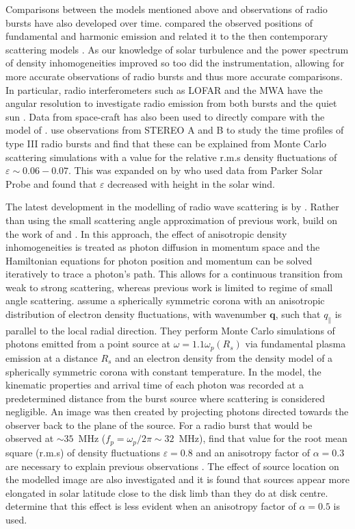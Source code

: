Comparisons between the models mentioned above and observations of radio bursts have also developed over time. \cite{Stewart1972} compared the observed positions of fundamental and harmonic emission and related it to the then contemporary scattering models \citep[e.g.][]{Fokker1965,Steinberg1971}. As our knowledge of solar turbulence and the power spectrum of density inhomogeneities improved so too did the instrumentation, allowing for more accurate observations of radio bursts and thus more accurate comparisons. In particular, radio interferometers such as LOFAR and the MWA have the angular resolution to investigate radio emission from both bursts \citep[e.g.][]{Zhang2020} and the quiet sun \citep[e.g.][]{Sharma2020}. Data from space-craft has also been used to directly compare with the model of \cite{Thejappa2007}. \cite{Krupar2018} use observations from STEREO A and B to study the time profiles of type III radio bursts and find that these can be explained from Monte Carlo scattering simulations with a value for the relative r.m.s density fluctuations of $\varepsilon \sim 0.06-0.07$. This was expanded on by \cite{Krupar2020} who used data from Parker Solar Probe and found that $\varepsilon$ decreased with height in the solar wind.

The latest development in the modelling of radio wave scattering is by \cite{Kontar2019}. Rather than using the small scattering angle approximation of previous work, \cite{Kontar2019} build on the work of \cite{Arzner1999} and \cite{Bian2019}. In this approach, the effect of anisotropic density inhomogeneities is treated as photon diffusion in momentum space and the Hamiltonian equations for photon position and momentum can be solved iteratively to trace a photon's path. This allows for a continuous transition from weak to strong scattering, whereas previous work is limited to regime of small angle scattering. \cite{Kontar2019} assume a spherically symmetric corona with an anisotropic distribution of electron density fluctuations, with wavenumber $\mathbf{q}$, such that $q_\parallel$ is parallel to the local radial direction. They perform Monte Carlo simulations of photons emitted from a point source at $\omega = 1.1 \omega_p(R_s)$ via fundamental plasma emission at a distance $R_s$ and an electron density from the \cite{Parker1960} density model of a spherically symmetric corona with constant temperature. In the \cite{Kontar2019} model, the kinematic properties and arrival time of each photon was recorded at a predetermined distance from the burst source where scattering is considered negligible. An image was then created by projecting photons directed towards the observer back to the plane of the source. For a radio burst that would be observed at $\sim 35$~MHz ($f_p = \omega_p/2 \pi \sim 32$~MHz), \cite{Kontar2019} find that value for the root mean square (r.m.s) of density fluctuations $\varepsilon = 0.8$ and an anisotropy factor of $\alpha = 0.3$ are necessary to explain previous observations \citep{Kontar2017}. The effect of source location on the modelled image are also investigated and it is found that sources appear more elongated in solar latitude close to the disk limb than they do at disk centre. \cite{Kontar2019} determine that this effect is less evident when an anisotropy factor of $\alpha = 0.5$ is used.

